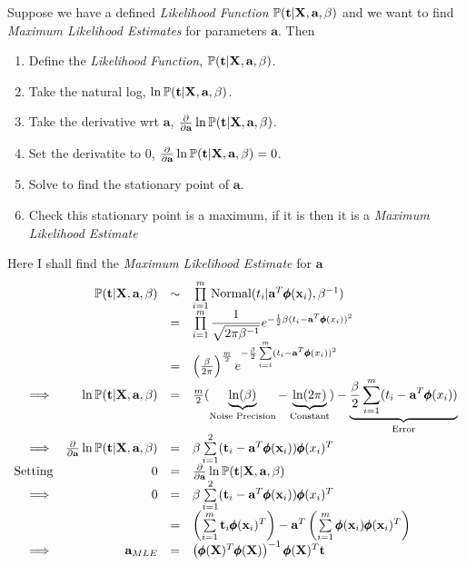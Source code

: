 \documentclass[11pt,a4paper]{article}
\begin{document}
Suppose we have a defined \textit{Likelihood Function} $\mathbb{P}(\textbf{t}|\textbf{X},\textbf{a},\beta)$ and we want to find \textit{Maximum Likelihood Estimates} for parameters $\textbf{a}$. Then
\begin{enumerate}[label=\roman*)]
	\item Define the \textit{Likelihood Function}, $\mathbb{P}(\textbf{t}|\textbf{X},\textbf{a},\beta)$.
	\item Take the natural log, $\ln\mathbb{P}(\textbf{t}|\textbf{X},\textbf{a},\beta)$.
	\item Take the derivative wrt $\textbf{a}$, $\frac{\partial}{\partial\textbf{a}}\ln\mathbb{P}(\textbf{t}|\textbf{X},\textbf{a},\beta)$.
	\item Set the derivatite to $0$, $\frac{\partial}{\partial\textbf{a}}\ln\mathbb{P}(\textbf{t}|\textbf{X},\textbf{a},\beta)=0$.
	\item Solve to find the stationary point of $\textbf{a}$.
	\item Check this stationary point is a maximum, if it is then it is a \textit{Maximum Likelihood Estimate}
\end{enumerate}

Here I shall find the \textit{Maximum Likelihood Estimate} for $\textbf{a}$
\[\begin{array}{rrcl}
&\mathbb{P}(\textbf{t}|\textbf{X},\textbf{a},\beta)&\sim&\prod\limits_{i=1}^m\text{Normal}(t_i|\textbf{a}^T\pmb{\phi}(\textbf{x}_i),\beta^{-1})\\
&&=&\prod\limits_{i=1}^m\dfrac{1}{\sqrt{2\pi\beta^{-1}}}e^{-\frac{1}{2}\beta(t_i-\textbf{a}^T\pmb{\phi}(x_i))^2}\\
&&=&\left(\frac{\beta}{2\pi}\right)^{\frac{m}{2}}e^{-\frac{\beta}{2}\sum\limits_{i=1}^m(t_i-\textbf{a}^T\pmb{\phi}(x_i))^2}\\
\implies&\ln\mathbb{P}(\textbf{t}|\textbf{X},\textbf{a},\beta)&=&\frac{m}{2}(\underbrace{\ln(\beta)}_{\text{Noise Precision}}-\underbrace{\ln(2\pi)}_{\text{Constant}})-\underbrace{\frac{\beta}{2}\sum\limits_{i=1}^m(t_i-\textbf{a}^T\pmb{\phi}(x_i))}_{\text{Error}}\\
\implies&\frac{\partial}{\partial\textbf{a}}\ln\mathbb{P}(\textbf{t}|\textbf{X},\textbf{a},\beta)&=&\beta\sum\limits_{i=1}^2(\textbf{t}_i-\textbf{a}^T\pmb{\phi}(\textbf{x}_i))\pmb{\phi}(x_i)^T\\
\text{Setting}&0&=&\frac{\partial}{\partial\textbf{a}}\ln\mathbb{P}(\textbf{t}|\textbf{X},\textbf{a},\beta)\\
\implies&0&=&\beta\sum\limits_{i=1}^2(\textbf{t}_i-\textbf{a}^T\pmb{\phi}(\textbf{x}_i))\pmb{\phi}(x_i)^T\\
&&=&\left(\sum\limits_{i=1}^m\textbf{t}_i\pmb{\phi}(\textbf{x}_i)^T\right)-\textbf{a}^T\left(\sum\limits_{i=1}^m\pmb{\phi}(\textbf{x}_i)\pmb{\phi}(\textbf{x}_i)^T\right)\\
\implies&\textbf{a}_{MLE}&=&\left(\pmb{\phi}(\textbf{X})^T\pmb{\phi}(\textbf{X})\right)^{-1}\pmb{\phi}(\textbf{X})^T\textbf{t}
\end{array}\]
\end{document}
